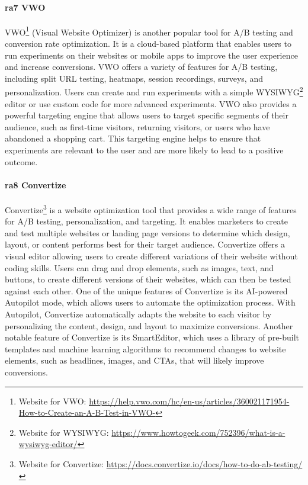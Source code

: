 \paragraph{\ac{ra}7 VWO}
VWO\footnote{Website for VWO: \url{https://help.vwo.com/hc/en-us/articles/360021171954-How-to-Create-an-A-B-Test-in-VWO-}} (Visual Website Optimizer) is another popular tool for A/B testing and conversion rate optimization. 
It is a cloud-based platform that enables users to run experiments on their websites or mobile apps to improve the user experience and increase conversions.
VWO offers a variety of features for A/B testing, including split URL testing, heatmaps, session recordings, surveys, and personalization. 
Users can create and run experiments with a simple WYSIWYG\footnote{Website for WYSIWYG: \url{https://www.howtogeek.com/752396/what-is-a-wysiwyg-editor/}} editor or use custom code for more advanced experiments.
VWO also provides a powerful targeting engine that allows users to target specific segments of their audience, such as first-time visitors, returning visitors, or users who have abandoned a shopping cart. 
This targeting engine helps to ensure that experiments are relevant to the user and are more likely to lead to a positive outcome.

\paragraph{\ac{ra}8 Convertize}
Convertize\footnote{Website for Convertize: \url{https://docs.convertize.io/docs/how-to-do-ab-testing/}} is a website optimization tool that provides a wide range of features for A/B testing, personalization, and targeting. 
It enables marketers to create and test multiple websites or landing page versions to determine which design, layout, or content performs best for their target audience.
Convertize offers a visual editor allowing users to create different variations of their website without coding skills. 
Users can drag and drop elements, such as images, text, and buttons, to create different versions of their websites, which can then be tested against each other.
One of the unique features of Convertize is its AI-powered Autopilot mode, which allows users to automate the optimization process. With Autopilot, Convertize automatically adapts the website to each visitor by personalizing the content, design, and layout to maximize conversions.
Another notable feature of Convertize is its SmartEditor, which uses a library of pre-built templates and machine learning algorithms to recommend changes to website elements, such as headlines, images, and CTAs, that will likely improve conversions.

